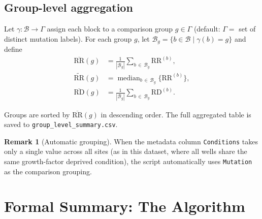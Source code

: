 \documentclass[11pt,a4paper]{article}
\theoremstyle{definition}
\newtheorem{remark}{Remark}[section]
\theoremstyle{plain}
\newcommand{\RD}{\mathrm{RD}}
\newcommand{\RR}{\mathrm{RR}}
\newcommand{\1}[1]{\mathbf{1}\!\left[#1\right]}
\begin{document}
\subsection{Group-level aggregation}

Let $\gamma : \mathcal{B} \to \Gamma$ assign each block to a comparison
group $g \in \Gamma$ (default: $\Gamma =$ set of distinct mutation labels).
For each group $g$, let $\mathcal{B}_g = \{b \in \mathcal{B} \mid \gamma(b) = g\}$ and define
\begin{align}
  \overline{\RR}(g)
    &= \frac{1}{|\mathcal{B}_g|}
       \sum_{b\,\in\,\mathcal{B}_g} \RR^{(b)},
    \label{eq:meanRR}\\[4pt]
  \widetilde{\RR}(g)
    &= \operatorname{median}_{b\,\in\,\mathcal{B}_g}\bigl\{\RR^{(b)}\bigr\},
    \label{eq:medianRR}\\[4pt]
  \overline{\RD}(g)
    &= \frac{1}{|\mathcal{B}_g|}
       \sum_{b\,\in\,\mathcal{B}_g} \RD^{(b)}.
    \label{eq:meanRD}
\end{align}

Groups are sorted by $\overline{\RR}(g)$ in descending order.
The full aggregated table is saved to \texttt{group\_level\_summary.csv}.

\begin{remark}[Automatic grouping]
When the metadata column \texttt{Conditions} takes only a single value across
all sites (as in this dataset, where all wells share the same growth-factor
deprived condition), the script automatically uses \texttt{Mutation} as the
comparison grouping.
\end{remark}

\section{Formal Summary: The Algorithm}
\end{document}
